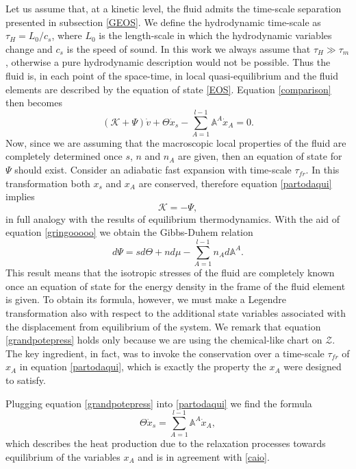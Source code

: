 \documentclass[useAMS,usenatbib,prd,twocolumn,nofootinbib]{revtex4-1}
\begin{document}
Let us assume that, at a kinetic level, the fluid admits the time-scale separation presented in subsection \ref{GEOS}. We define the hydrodynamic time-scale as $\tau_H = L_0/c_s$, where $L_0$ is the length-scale in which the hydrodynamic variables change and $c_s$ is the speed of sound. In this work we  always assume that $\tau_H \gg \tau_m$, otherwise a pure hydrodynamic description would not be possible. Thus the fluid is, in each point of the space-time, in local quasi-equilibrium and the fluid elements are described by the equation of state \eqref{EOS}. 
Equation  \eqref{comparison} then becomes
\begin{equation}\label{partodaqui}
(\mathcal{K}+\Psi) \dot{v} + \Theta \dot{x}_s -\sum_{A=1}^{l-1} \mathbb{A}^A \dot{x}_A =0.
\end{equation}
Now, since we are assuming that the macroscopic local properties of the fluid are completely determined once $s$, $n$ and $n_A$ are given, then an equation of state for $\Psi$ should exist. Consider an adiabatic fast expansion with time-scale $\tau_{fr}$. In this transformation both $x_s$ and $x_A$ are conserved, therefore equation \eqref{partodaqui} implies
\begin{equation}\label{grandpotepress}
\mathcal{K} = -\Psi,
\end{equation}
in full analogy with the results of equilibrium thermodynamics. With the aid of equation \eqref{gringooooo} we obtain the Gibbs-Duhem relation
\begin{equation}
d\Psi = s d\Theta + n d\mu - \sum_{A=1}^{l-1} n_A d\mathbb{A}^A  .
\end{equation}
This result means that the isotropic stresses of the fluid are completely known once an equation of state for the energy density in the frame of the fluid element is given. To obtain its formula, however, we must make a Legendre transformation also with respect to the additional state variables associated with the displacement from equilibrium of the system. We remark that equation \eqref{grandpotepress} holds only because we are using the chemical-like chart on $\mathcal{Z}$. The key ingredient, in fact, was to invoke the conservation over a time-scale $\tau_{fr}$ of $x_A$ in equation \eqref{partodaqui}, which is exactly the property the $x_A$ were designed to satisfy.

Plugging equation \eqref{grandpotepress} into \eqref{partodaqui} we find the formula
\begin{equation}\label{entttropppia}
\Theta \dot{ x}_s =\sum_{A=1}^{l-1} \mathbb{A}^A \dot{x}_A ,
\end{equation}
which describes the heat production due to the relaxation processes towards equilibrium of the variables $x_A$ and is in agreement with \eqref{caio}.
\end{document}
